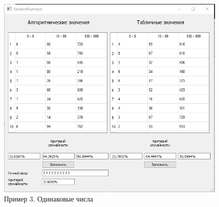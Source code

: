 \documentclass[12pt,a4paper,oneside]{report}
\begin{document}
	\begin{figure}[H]
		\centering
		\includegraphics[scale=0.7]{3.png}
		\caption{Пример 3. Одинаковые числа}
		\label{fig3:image}
	\end{figure}
	
\end{document}
